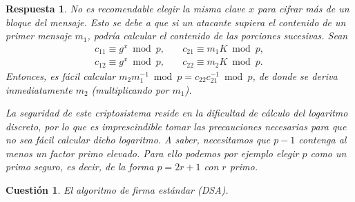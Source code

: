 \documentclass[
  a4paper,
  spanish,
  12pt,
]{scrartcl}
\theoremstyle{ejercicio-style}
\newtheorem{ejer}{Cuestión}
\theoremstyle{remark-style}
\newtheorem*{sol}{Respuesta}
\theoremstyle{teorema-style}
\begin{document}
\begin{sol}
No es recomendable elegir la misma clave $x$ para cifrar más de un bloque del mensaje. Esto se debe a que si un atacante supiera el contenido de un primer mensaje \(m_{1}\), podría calcular el contenido de las porciones sucesivas. Sean
\begin{align*}
c_{11}\equiv g^x \bmod{p}, \quad& c_{21}\equiv m_{1}K\bmod{p}, \\
c_{12}\equiv g^x \bmod{p}, \quad& c_{22}\equiv m_{2}K\bmod{p}.
\end{align*}
Entonces, es fácil calcular \(m_2m_1^{-1} \bmod p = c_{22}c_{21}^{-1} \bmod{p}\), de donde se deriva inmediatamente \(m_{2}\) (multiplicando por \(m_{1}\)).

La seguridad de este criptosistema reside en la dificultad de cálculo del logaritmo discreto, por lo que es imprescindible tomar las precauciones necesarias para que no sea fácil calcular dicho logaritmo. A saber, necesitamos que $p-1$ contenga al menos un factor primo elevado. Para ello podemos por ejemplo elegir $p$ como un \textit{primo seguro}, es decir, de la forma $p = 2r + 1$ con $r$ primo.
\end{sol}

\begin{ejer}
  El algoritmo de firma estándar (DSA).
\end{ejer}
\end{document}
